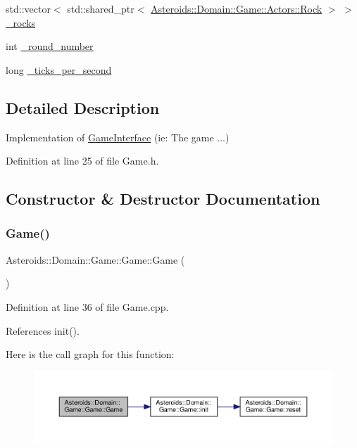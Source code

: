 \begin{DoxyCompactItemize}
\item 
std\+::vector$<$ std\+::shared\+\_\+ptr$<$ \hyperlink{classAsteroids_1_1Domain_1_1Game_1_1Actors_1_1Rock}{Asteroids\+::\+Domain\+::\+Game\+::\+Actors\+::\+Rock} $>$ $>$ \hyperlink{classAsteroids_1_1Domain_1_1Game_1_1Game_ad424a9c9f9fdd4bf7785c4da946cb57e}{\+\_\+rocks}
\item 
int \hyperlink{classAsteroids_1_1Domain_1_1Game_1_1Game_a2992a61faa00be0bf512fed5c72fbc07}{\+\_\+round\+\_\+number}
\item 
long \hyperlink{classAsteroids_1_1Domain_1_1Game_1_1Game_ab370339e44ac6ac2aa78bfdde8bc7ea5}{\+\_\+ticks\+\_\+per\+\_\+second}
\end{DoxyCompactItemize}


\subsection{Detailed Description}
Implementation of \hyperlink{classAsteroids_1_1Domain_1_1Game_1_1GameInterface}{Game\+Interface} (ie\+: The game ...) 

Definition at line 25 of file Game.\+h.



\subsection{Constructor \& Destructor Documentation}
\mbox{\label{classAsteroids_1_1Domain_1_1Game_1_1Game_a93e2f263a0149964d2ff83f2554db5af}} 
\subsubsection{\texorpdfstring{Game()}{Game()}}
{\footnotesize\ttfamily Asteroids\+::\+Domain\+::\+Game\+::\+Game\+::\+Game (\begin{DoxyParamCaption}{ }\end{DoxyParamCaption})}



Definition at line 36 of file Game.\+cpp.



References init().

Here is the call graph for this function\+:\nopagebreak
\begin{figure}[H]
\begin{center}
\leavevmode
\includegraphics[width=350pt]{classAsteroids_1_1Domain_1_1Game_1_1Game_a93e2f263a0149964d2ff83f2554db5af_cgraph}
\end{center}
\end{figure}


